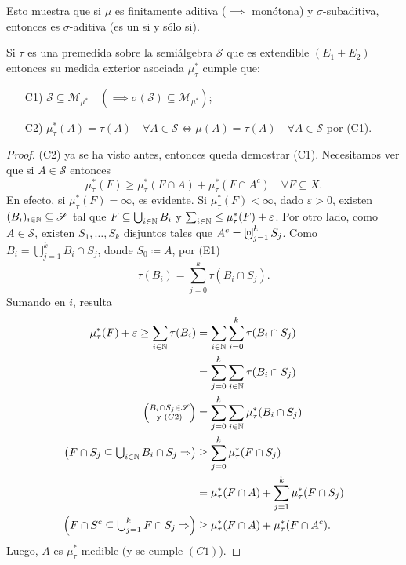 \begin{observe}
	Esto muestra que si $\mu$ es finitamente aditiva ($\implies$ monótona) y $\sigma$-subaditiva, entonces es $\sigma$-aditiva (es un si y sólo si).
\end{observe}

\begin{prop}
	Si $\tau$ es una premedida sobre la semiálgebra $\mathscr{S}$ que es extendible $(E_1 + E_2)$ entonces su medida exterior asociada $\mu^{*}_{\tau}$ cumple que:
	\begin{enumerate}
		\item[C1)] $\mathscr{S} \subseteq \mathscr{M}_{\mu^*} \quad (\implies \sigma(\mathscr{S}) \subseteq \mathscr{M}_{\mu^{*}})$;

		\item[C2)] $\mu^{*}_{\tau}(A) = \tau(A) \quad \forall A \in \mathscr{S} \iff \mu(A) = \tau(A) \quad \forall A \in \mathscr{S}$ por (C1).
	\end{enumerate}
\end{prop}
\begin{proof}
	(C2) ya se ha visto antes, entonces queda demostrar (C1). Necesitamos ver que si $A \in \mathscr{S}$ entonces
	\[ \mu^{*}_{\tau}(F) \geq \mu^{*}_{\tau}(F \cap A) + \mu^{*}_{\tau}(F \cap A^c) \quad \forall F \subseteq X. \]
	En efecto, si $\mu^{*}_{\tau}(F) = \infty$, es evidente. Si $\mu^{*}_{\tau}(F) < \infty$, dado $\varepsilon > 0$, existen $(B_i)_{i\in\mathbb{N}} \subseteq \mathscr{S}$ tal que $F \subseteq \bigcup_{i\in\mathbb{N}} B_i$ y $\sum_{i\in\mathbb{N}} \leq \mu^{*}_{\tau}(F) + \varepsilon$. Por otro lado, como $A \in \mathscr{S}$, existen $S_{1},\dots,S_{k}$ disjuntos tales que $A^c = \textbigcupd_{j=1}^{k} S_j$. Como $B_i = \bigcup_{j=1}^{k} B_i \cap S_j$, donde $S_0 \coloneq A$, por (E1)
	\[ \tau(B_i) = \sum_{j=0}^{k} \tau(B_i \cap S_j). \]
	Sumando en $i$, resulta
	\begin{align*}
		\mu^{*}_{\tau}(F) + \varepsilon \geq \sum_{i\in\mathbb{N}} \tau(B_i) &= \sum_{i\in\mathbb{N}}\sum_{i=0}^{k} \tau(B_i \cap S_j) \\
		&= \sum_{j=0}^{k} \sum_{i\in\mathbb{N}}\tau(B_i \cap S_j) \\
		\left(\substack{B_i \cap S_j \in \mathscr{S} \\
					\text{y } (C2)}\right) &= \sum_{j=0}^{k} \sum_{i\in\mathbb{N}} \mu^{*}_{\tau}(B_i \cap S_j) \\
		\left(F \cap S_j \subseteq \textstyle\bigcup_{i\in\mathbb{N}} B_i \cap S_j \Rightarrow\right) & \geq \sum_{j=0}^{k} \mu^{*}_{\tau}(F \cap S_j) \\
		&= \mu^{*}_{\tau}(F \cap A) + \sum_{j=1}^{k} \mu^{*}_{\tau}(F \cap S_j) \\
		\left(F \cap S^c \subseteq \textstyle\bigcup_{j=1}^{k} F \cap S_j \Rightarrow \right) & \geq \mu^{*}_{\tau}(F \cap A) + \mu^{*}_{\tau}(F \cap A^c)
	.\end{align*}
	Luego, $A$ es $\mu^{*}_{\tau}$-medible (y se cumple $(C1)$).
\end{proof}

